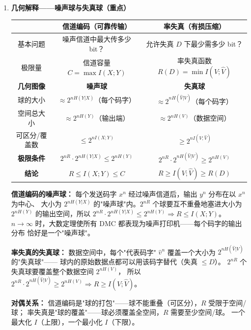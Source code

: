 \documentclass[12pt,a4paper]{ctexart}
\theoremstyle{definition}
\begin{document}
\begin{enumerate}[label=\textbf{\arabic*.}, leftmargin=*]
  \item \textbf{几何解释——噪声球与失真球（重点）}

  \begin{keybox}[信息论两大极限的几何统一]
  \begin{center}
  \begin{tabular}{c|c|c}
  \toprule
  & \textbf{信道编码（可靠传输）} & \textbf{率失真（有损压缩）} \\
  \midrule
  基本问题 & 噪声信道中最大传多少 bit？ & 允许失真 $D$ 下最少需多少 bit？ \\
  极限量 & 信道容量 $C = \max I(X;Y)$ & 率失真函数 $R(D) = \min I(V;\hat{V})$ \\
  \textbf{几何图像} & \textbf{噪声球} & \textbf{失真球} \\
  球的大小 & $\approx 2^{nH(Y|X)}$（每个码字） & $\approx 2^{nH(\hat{V}|V)}$（每个码字） \\
  空间总大小 & $\approx 2^{nH(Y)}$（输出端） & $\approx 2^{nH(V)}$（数据空间） \\
  可区分/覆盖数 & $\leq 2^{nI(X;Y)}$ & $\geq 2^{nI(V;\hat{V})}$ \\
  \textbf{极限条件} & $2^{nR} \cdot 2^{nH(Y|X)} \leq 2^{nH(Y)}$ & $2^{nR} \cdot 2^{nH(\hat{V}|V)} \geq 2^{nH(V)}$ \\
  \textbf{结论} & $R \leq I(X;Y) \leq C$ & $R \geq I(V;\hat{V}) \geq R(D)$ \\
  \bottomrule
  \end{tabular}
  \end{center}

  \textbf{信道编码的噪声球：}
  每个发送码字 $x^n$ 经过噪声信道后，输出 $y^n$ 分布在以 $x^n$ 为中心、
  大小为 $2^{nH(Y|X)}$ 的"噪声球"内。$2^{nR}$ 个球要互不重叠地塞进大小为 $2^{nH(Y)}$
  的输出空间，所以 $2^{nR} \cdot 2^{nH(Y|X)} \leq 2^{nH(Y)} \Rightarrow R \leq I(X;Y)$。
  $n\to\infty$ 时，大数定理使所有 DMC 都表现为噪声打印机——每个码字的输出分布
  恰好是一个"噪声球"。

  \textbf{率失真的失真球：}
  数据空间中，每个"代表码字" $\hat{v}^n$ 覆盖一个大小为 $2^{nH(\hat{V}|V)}$ 的"失真球"——
  球内的原始数据点都可以用该码字替代（失真 $\leq D$）。
  $2^{nR}$ 个失真球要覆盖整个数据空间 $2^{nH(V)}$，
  所以 $2^{nR} \cdot 2^{nH(\hat{V}|V)} \geq 2^{nH(V)} \Rightarrow R \geq I(V;\hat{V})$。

  \textbf{对偶关系：}
  信道编码是"球的打包"——球不能重叠（可区分），$R$ 受限于空间/球；
  率失真是"球的覆盖"——球必须覆盖全空间，$R$ 需要至少空间/球。
  一个最大化 $I$（上限），一个最小化 $I$（下限）。
  \end{keybox}

\end{enumerate}
\end{document}
